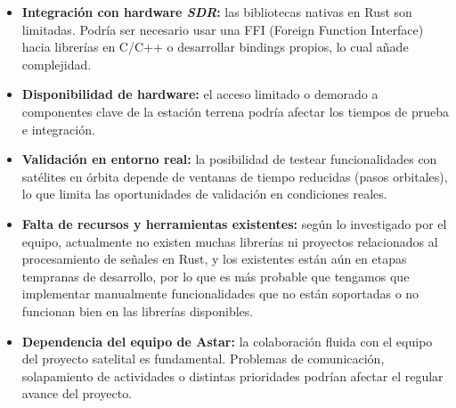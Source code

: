 \begin{itemize}
    \item \textbf{Integración con hardware \textit{SDR}:} las bibliotecas nativas en Rust son limitadas. Podría ser necesario usar una FFI (Foreign Function Interface) hacia librerías en C/C++ o desarrollar bindings propios, lo cual añade complejidad.
    
    \item \textbf{Disponibilidad de hardware:} el acceso limitado o demorado a componentes clave de la estación terrena podría afectar los tiempos de prueba e integración.

    \item \textbf{Validación en entorno real:} la posibilidad de testear funcionalidades con satélites en órbita depende de ventanas de tiempo reducidas (pasos orbitales), lo que limita las oportunidades de validación en condiciones reales.

    \item \textbf{Falta de recursos y herramientas existentes:} según lo investigado por el equipo, actualmente no existen muchas librerías ni proyectos relacionados al procesamiento de señales en Rust, y los existentes están aún en etapas tempranas de desarrollo, por lo que es más probable que tengamos que implementar manualmente funcionalidades que no están soportadas o no funcionan bien en las librerías disponibles.
    
    \item \textbf{Dependencia del equipo de Astar:} la colaboración fluida con el equipo del proyecto satelital es fundamental. Problemas de comunicación, solapamiento de actividades o distintas prioridades podrían afectar el regular avance del proyecto.
\end{itemize}